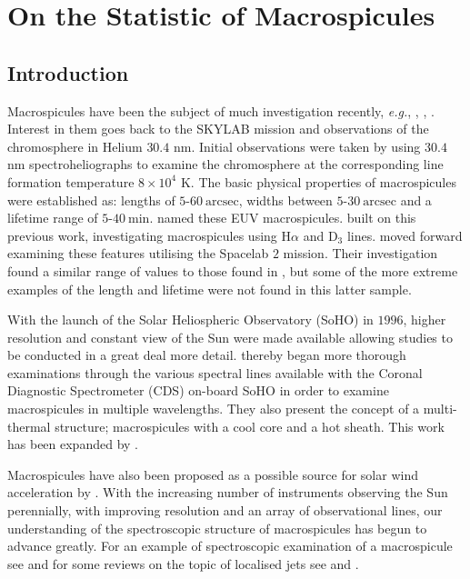 
\chapter{On the Statistic of Macrospicules \label{ch:3}}  %

\section{Introduction}
Macrospicules have been the subject of much investigation recently, \emph{e.g.}, \cite{Sterling2010b}, \cite{Madjarska2011b}, \cite{Murawski2011}. Interest in them goes back to the SKYLAB mission and observations of the chromosphere in Helium $30.4$ nm. Initial observations were taken by \cite{Bohlin1975} using $30.4$ nm spectroheliographs to examine the chromosphere at the corresponding line formation temperature $8 \times 10^4$ K. The basic physical properties of macrospicules were established as: lengths of $5$-$60\ \textrm{arcsec}$, widths between $5$-$30\ \textrm{arcsec}$ and a lifetime range of $5$-$40\ \textrm{min}$. \cite{Bohlin1975} named these EUV macrospicules. \cite{LaBonte79} built on this previous work, investigating macrospicules using H$\alpha$ and D$_3$ lines. \cite{Dere89} moved forward examining these features utilising the Spacelab $2$ mission. Their investigation found a similar range of values to those found in \cite{Bohlin1975}, but some of the more extreme examples of the length and lifetime were not found in this latter sample.

With the launch of the Solar Heliospheric Observatory (SoHO) in $1996$, higher resolution and constant view of the Sun were made available allowing studies to be conducted in a great deal more detail. \cite{Pike1997} thereby began more thorough examinations through the various spectral lines available with the Coronal Diagnostic Spectrometer (CDS) on-board SoHO in order to examine macrospicules in multiple wavelengths. They also present the concept of a multi-thermal structure; macrospicules with a cool core and a hot sheath. This work has been expanded by \cite{Parenti2002}. 

Macrospicules have also been proposed as a possible source for solar wind acceleration by \cite{Pike_Mason1998}. With the increasing number of instruments observing the Sun perennially, with improving resolution and an array of observational lines, our understanding of the spectroscopic structure of macrospicules has begun to advance greatly. For an example of spectroscopic examination of a macrospicule see \cite{Scullion2010} and for some reviews on the topic of localised jets see \cite{Sterling2000} and \cite{Zaqara_Erdelyi2009}.

